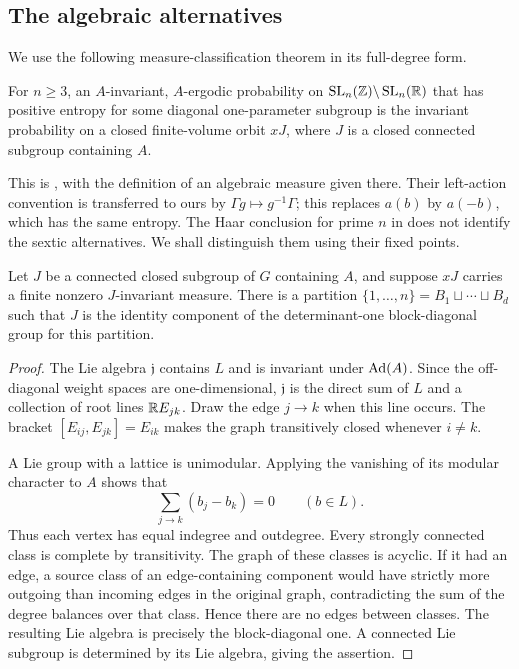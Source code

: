 \subsection{The algebraic alternatives}

We use the following measure-classification theorem in its full-degree
form.

\begin{theorem}\label{thm:ekl}
For $n\ge3$, an $A$-invariant, $A$-ergodic probability on
$\operatorname{SL}_n(\mathbb Z)\backslash\operatorname{SL}_n(\mathbb R)$ that has positive entropy for some
diagonal one-parameter subgroup is the invariant probability on a closed
finite-volume orbit $xJ$, where $J$ is a closed connected subgroup
containing $A$.
\end{theorem}

This is \cite[Theorem~1.3]{EKL2006}, with the definition of an algebraic
measure given there. Their left-action convention is transferred to ours
by $\Gamma g\mapsto g^{-1}\Gamma$; this replaces $a(b)$ by $a(-b)$,
which has the same entropy. The Haar conclusion for prime $n$ in
\cite[Corollary~1.4]{EKL2006} does not identify the sextic alternatives.
We shall distinguish them using their fixed points.

\begin{lemma}\label{lem:block-groups}
Let $J$ be a connected closed subgroup of $G$ containing $A$, and suppose
$xJ$ carries a finite nonzero $J$-invariant measure. There is a partition
$\{1,\ldots,n\}=B_1\sqcup\cdots\sqcup B_d$ such that $J$ is the
identity component of the determinant-one block-diagonal group for this
partition.
\end{lemma}

\begin{proof}
The Lie algebra $\mathfrak j$ contains $L$ and is invariant under
$\operatorname{Ad}(A)$. Since the off-diagonal weight spaces are one-dimensional,
$\mathfrak j$ is the direct sum of $L$ and a collection of root lines
$\mathbb R E_{jk}$. Draw the edge $j\to k$ when this line occurs. The bracket
$[E_{ij},E_{jk}]=E_{ik}$ makes the graph transitively closed whenever
$i\ne k$.

A Lie group with a lattice is unimodular. Applying the vanishing of its
modular character to $A$ shows that
\[
 \sum_{j\to k}(b_j-b_k)=0\qquad(b\in L).
\]
Thus each vertex has equal indegree and outdegree. Every strongly
connected class is complete by transitivity. The graph of these classes
is acyclic. If it had an edge, a source class of an edge-containing
component would have strictly more outgoing than incoming edges in the
original graph, contradicting the sum of the degree balances over that
class. Hence there are no edges between classes.
The resulting Lie algebra is precisely the block-diagonal one. A
connected Lie subgroup is determined by its Lie algebra, giving the
assertion.
\end{proof}

